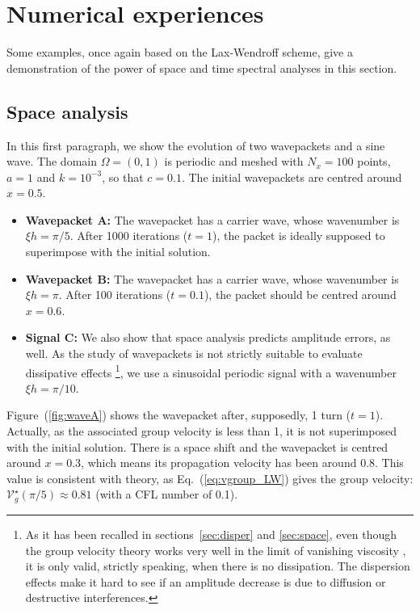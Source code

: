 

\section{Numerical experiences \label{sec:num_xp}}

Some examples, once again based on the Lax-Wendroff scheme, give a demonstration of the power of space and time spectral analyses in this section. 

\subsection{Space analysis}
In this first paragraph, we show the evolution of two wavepackets and a sine wave. The domain $\Omega=(0,1)$ is periodic and meshed with $N_x=100$ points, $a=1$ and $k = 10^{-3}$, so that $c=0.1$. The initial wavepackets are centred around $x=0.5$.
\begin{itemize}
 \item {\bf Wavepacket A:} The wavepacket has a carrier wave, whose wavenumber is $\xi h = \pi / 5$. After 1000 iterations ($t=1$), the packet is ideally supposed to superimpose with the initial solution.
 \item {\bf Wavepacket B:} The wavepacket has a carrier wave, whose wavenumber is $\xi h = \pi$. After 100 iterations ($t=0.1$), the packet should be centred around $x=0.6$.
 \item {\bf Signal C:} We also show that space analysis predicts amplitude errors, as well. As the study of wavepackets is not strictly suitable to evaluate dissipative effects \footnote{As it has been recalled in sections~\ref{sec:disper} and \ref{sec:space}, even though the group velocity theory works very well in the limit of vanishing viscosity \cite{Karni:1994}, it is only valid, strictly speaking, when there is no dissipation. The dispersion effects make it hard to see if an amplitude decrease is due to diffusion or destructive interferences.}, we use a sinusoidal periodic signal with a wavenumber $\xi h = \pi / 10$. 
\end{itemize}

 Figure~(\ref{fig:waveA}) shows the wavepacket after, supposedly, 1 turn ($t=1$). Actually, as the associated group velocity is less than 1, it is not superimposed with the initial solution. There is a space shift and the wavepacket is centred around $x=0.3$, which means its propagation velocity has been around 0.8. This value is consistent with theory, as Eq.~(\ref{eq:vgroup_LW}) gives the group velocity: $\mathcal{V}_g^{\star} (\pi/5) \approx 0.81$ (with a CFL number of 0.1). 


